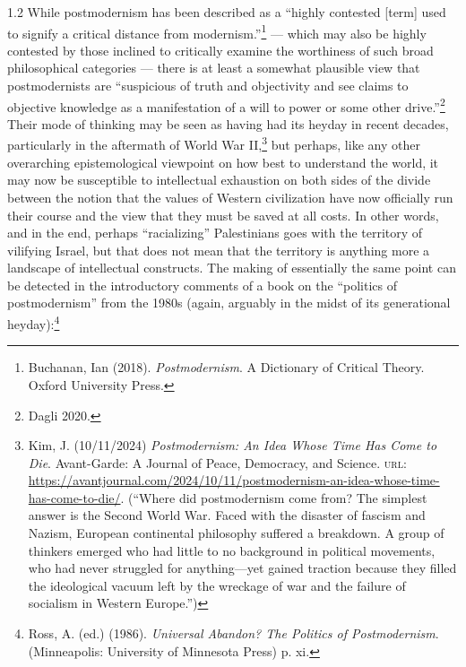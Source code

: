 \documentclass[../unravbook.tex]{subfiles}
\begin{document}
\begin{spacing}{1.2}
While postmodernism has been described as a ``highly contested [term] used to signify a critical distance from modernism.''\footnote{Buchanan, Ian (2018). \textit{Postmodernism}. A Dictionary of Critical Theory. Oxford University Press.} --- which may also be highly contested by those inclined to critically examine the worthiness of such broad philosophical categories --- there is at least a somewhat plausible view that postmodernists are ``suspicious of truth and objectivity and see claims to objective knowledge as a manifestation of a will to power or some other drive.''\footnote{Dagli 2020.} Their mode of thinking may be seen as having had its heyday in recent decades, particularly in the aftermath of World War II,\footnote{Kim, J. (10/11/2024) \textit{Postmodernism: An Idea Whose Time Has Come to Die}. Avant-Garde: A Journal of Peace, Democracy, and Science. \textsc{url: }\url{https://avantjournal.com/2024/10/11/postmodernism-an-idea-whose-time-has-come-to-die/}. (``Where did postmodernism come from? The simplest answer is the Second World War. Faced with the disaster of fascism and Nazism, European continental philosophy suffered a breakdown. A group of thinkers emerged who had little to no background in political movements, who had never struggled for anything—yet gained traction because they filled the ideological vacuum left by the wreckage of war and the failure of socialism in Western Europe.'')} but perhaps, like any other overarching epistemological viewpoint on how best to understand the world, it may now be susceptible to intellectual exhaustion on both sides of the divide between the notion that the values of Western civilization have now officially run their course and the view that they must be saved at all costs. In other words, and in the end, perhaps ``racializing'' Palestinians goes with the territory of vilifying Israel, but that does not mean that the territory is anything more a landscape of intellectual constructs. The making of essentially the same point can be detected in the introductory comments of a book on the ``politics of postmodernism'' from the 1980s (again, arguably in the midst of its generational heyday):\footnote{Ross, A. (ed.) (1986). \textit{Universal Abandon? The Politics of Postmodernism}. (Minneapolis: University of Minnesota Press) p. xi.}
 

\end{spacing}
\end{document}
